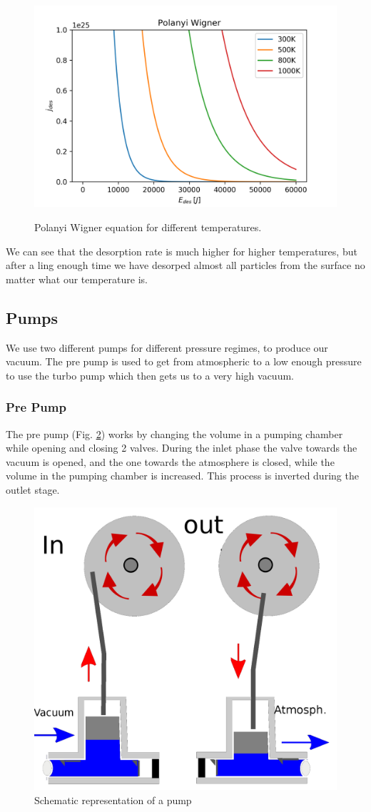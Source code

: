 \documentclass[]{article}
\begin{document}
\begin{figure}[h]
\centering
\includegraphics[width=0.8\linewidth]{"Plots/Polanyi Wigner"}
\label{fig:polanyi}
\caption{Polanyi Wigner equation for different temperatures.}
\end{figure}

We can see that the desorption rate is much higher for higher temperatures, but after a ling enough time we have desorped almost all particles from the surface no matter what our temperature is. 

\subsection{Pumps}
We use two different pumps for different pressure regimes, to produce our vacuum. The pre pump is used to get from atmospheric to a low enough pressure to use the turbo pump which then gets us to a very high vacuum.

\subsubsection{Pre Pump}
The pre pump (Fig. \ref{fig:prepump}) works by changing the volume in a pumping chamber while opening and closing 2 valves. During the inlet phase the valve towards the vacuum is opened, and the one towards the atmosphere is closed, while the volume in the pumping chamber is increased. This process is inverted during the outlet stage.

\begin{figure}[h]
	\centering
	\includegraphics[width=.5\linewidth]{Bilder/pump}
	\caption{Schematic representation of a pump}
	\label{fig:prepump}
\end{figure}
\end{document}
